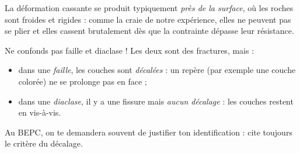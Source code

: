 \documentclass[11pt]{article}
\begin{document}
La déformation cassante se produit typiquement \emph{près de la surface}, où les roches sont froides et rigides : comme la craie de notre expérience, elles ne peuvent pas se plier et elles cassent brutalement dès que la contrainte dépasse leur résistance.

\begin{attention}
Ne confonds pas faille et diaclase ! Les deux sont des fractures, mais :
\begin{itemize}
\item dans une \emph{faille}, les couches sont \emph{décalées} : un repère (par exemple une couche colorée) ne se prolonge pas en face ;
\item dans une \emph{diaclase}, il y a une fissure mais \emph{aucun décalage} : les couches restent en vis-à-vis.
\end{itemize}
Au BEPC, on te demandera souvent de justifier ton identification : cite toujours le critère du décalage.
\end{attention}
\end{document}
